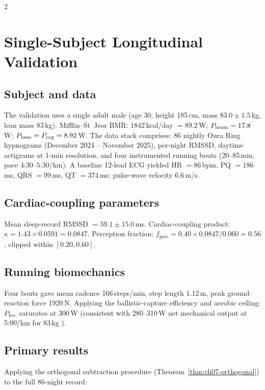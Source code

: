 \begin{multicols}{2}

\section{Single-Subject Longitudinal Validation}
\label{sec:ch07-validation}

\subsection{Subject and data}

The validation uses a single adult male (age 30, height 185\,cm, mass
$83.0 \pm 1.5$\,kg, lean mass 83\,kg).  Mifflin--St~Jeor BMR:
$1842$\,kcal/day $= 89.2$\,W; $P_{\mathrm{brain}} = 17.8$\,W; $P_{\mathrm{base}} = P_{\mathrm{cog}} =
8.92$\,W.  The data stack comprises: 86 nightly Oura Ring hypnograms
(December 2024 -- November 2025), per-night RMSSD, daytime actigrams at
1-min resolution, and four instrumented running bouts (20--85\,min,
pace $4$:$30$--$5$:$30$/km).  A baseline 12-lead ECG yielded HR $= 86$\,bpm,
PQ $= 186$\,ms, QRS $= 99$\,ms, QT $= 374$\,ms; pulse-wave velocity
$6.6$\,m/s.

\subsection{Cardiac-coupling parameters}

Mean sleep-record RMSSD $= 59.1 \pm 15.0$\,ms.  Cardiac-coupling product:
$\kappa = 1.43 \times 0.0591 = 0.0847$.  Perception fraction:
$f_{\mathrm{perc}} = 0.40 \times 0.0847/0.060 = 0.56$, clipped within
$[0.20, 0.60]$.

\subsection{Running biomechanics}

Four bouts gave mean cadence 166\,steps/min, step length 1.12\,m, peak
ground-reaction force 1920\,N.  Applying the ballistic-capture efficiency
and aerobic ceiling: $P_{\mathrm{loc}}$ saturates at 300\,W (consistent with
280--310\,W net mechanical output at 5:00/km for 83\,kg \citep{jones2011}).

\subsection{Primary results}

Applying the orthogonal subtraction procedure
(Theorem~\ref{thm:ch07-orthogonal}) to the full 86-night record:


\end{multicols}

